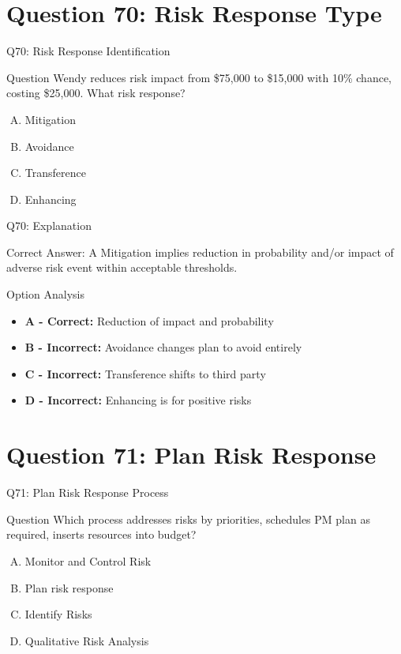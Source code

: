 \documentclass{beamer}
\begin{document}
	\section{Question 70: Risk Response Type}
	
	\begin{frame}{Q70: Risk Response Identification}
		\begin{block}{Question}
			Wendy reduces risk impact from \$75,000 to \$15,000 with 10\% chance, costing \$25,000. What risk response?
		\end{block}
		\begin{enumerate}[(A)]
			\item Mitigation
			\item Avoidance
			\item Transference
			\item Enhancing
		\end{enumerate}
	\end{frame}
	
	\begin{frame}{Q70: Explanation}
		\begin{block}{Correct Answer: A}
			Mitigation implies reduction in probability and/or impact of adverse risk event within acceptable thresholds.
		\end{block}
		\begin{block}{Option Analysis}
			\begin{itemize}
				\item \textbf{A - Correct:} Reduction of impact and probability
				\item \textbf{B - Incorrect:} Avoidance changes plan to avoid entirely
				\item \textbf{C - Incorrect:} Transference shifts to third party
				\item \textbf{D - Incorrect:} Enhancing is for positive risks
			\end{itemize}
		\end{block}
	\end{frame}
	
	\section{Question 71: Plan Risk Response}
	
	\begin{frame}{Q71: Plan Risk Response Process}
		\begin{block}{Question}
			Which process addresses risks by priorities, schedules PM plan as required, inserts resources into budget?
		\end{block}
		\begin{enumerate}[(A)]
			\item Monitor and Control Risk
			\item Plan risk response
			\item Identify Risks
			\item Qualitative Risk Analysis
		\end{enumerate}
	\end{frame}
	
\end{document}
